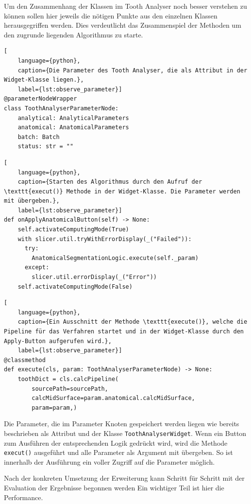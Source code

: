 \pagebreak

Um den Zusammenhang der Klassen im Tooth Analyser noch besser verstehen zu
können sollen hier jeweils die nötigen Punkte aus den einzelnen Klassen
herausgegriffen werden. Dies verdeutlicht das Zusammenspiel der Methoden um den zugrunde
liegenden Algorithmus zu starte.

\begin{lstlisting}[
    language={python},
    caption={Die Parameter des Tooth Analyser, die als Attribut in der Widget-Klasse liegen.},
    label={lst:observe_parameter}]
@parameterNodeWrapper
class ToothAnalyserParameterNode:
    analytical: AnalyticalParameters
    anatomical: AnatomicalParameters
    batch: Batch
    status: str = ""
\end{lstlisting}

\begin{lstlisting}[
    language={python},
    caption={Starten des Algorithmus durch den Aufruf der \texttt{execut()} Methode in der Widget-Klasse. Die Parameter werden mit übergeben.},
    label={lst:observe_parameter}]
def onApplyAnatomicalButton(self) -> None:
    self.activateComputingMode(True)
    with slicer.util.tryWithErrorDisplay(_("Failed")):
	  try:
	    AnatomicalSegmentationLogic.execute(self._param)
	  except:
	    slicer.util.errorDisplay(_("Error"))
    self.activateComputingMode(False)
\end{lstlisting}

\begin{lstlisting}[
    language={python},
    caption={Ein Ausschnitt der Methode \texttt{execute()}, welche die Pipeline für das Verfahren startet und in der Widget-Klasse durch den Apply-Button aufgerufen wird.},
    label={lst:observe_parameter}]
@classmethod
def execute(cls, param: ToothAnalyserParameterNode) -> None:
    toothDict = cls.calcPipeline(
	    sourcePath=sourcePath,
	    calcMidSurface=param.anatomical.calcMidSurface,
	    param=param,)
\end{lstlisting}

Die Parameter, die im Parameter Knoten gespeichert werden liegen wie bereits beschrieben
als Attribut und der Klasse \texttt{ToothAnalyserWidget}. Wenn ein Button zum Ausführen
der entsprechenden Logik gedrückt wird, wird die Methode \texttt{execut()} ausgeführt
und alle Parameter als Argument mit übergeben. So ist innerhalb der Ausführung
ein voller Zugriff auf die Parameter möglich.

Nach der konkreten Umsetzung der Erweiterung kann Schritt für Schritt mit der
Evaluation der Ergebnisse begonnen werden Ein wichtiger Teil ist hier die
Performance.

